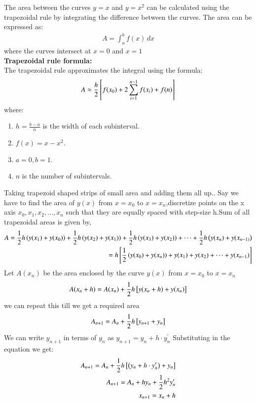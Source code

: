 \documentclass[journal]{IEEEtran}
\begin{document}
The area between the curves 
$y=x$ and $y=x^2$ can be calculated using the trapezoidal rule by integrating the difference between the curves. The area can be expressed as:
\begin{align}
    A = \int_{a}^{b} f(x) \, dx
\end{align}
where the curves intersect at $x=0$ and $x=1$\\
\textbf{Trapezoidal rule formula:}\\
The trapezoidal rule approximates the integral using the formula:\\
\begin{align}
    A \approx \frac{h}{2}{}\left[f(x_0)+2\sum_{i=1}^{n-1} f(x_i) + f(n)\right]
\end{align}
where:\\
\begin{enumerate}
   \item $h=\frac{b-a}{n}$ is the width of each subinterval.
   \item $f(x) = x-x^2$.
   \item $a=0,b=1$.
   \item $n$ is the number of subintervals.
\end{enumerate}
Taking trapezoid shaped strips of small area and adding them all up.. Say we have to
find the area of $y(x)$ from $x=x_0$ to $x = x_n$,discretize points on the x axis $x_0,x_1,x_2,...,x_n$ such that they are equally spaced with step-size h.Sum of all trapezoidal areas is given by,
\begin{align}
    A = \frac{1}{2}h\left(y(x_1)+y(x_0)\right)+\frac{1}{2}h\left(y(x_2)+y(x_1)\right)+\frac{1}{2}h\left(y(x_3)+y(x_2)\right)+\dots+\frac{1}{2}h\left(y(x_n)+y(x_{n-1)}\right)\\
    = h{}\left[\frac{1}{2}\left(y(x_0)+y(x_n)\right)+y(x_1)+y(x_2)+\dots+y(x_{n-1})\right]
\end{align}
Let $A(x_n)$ be the area enclosed by the curve $y(x)$ from $x=x_0$ to $x=x_n$
\begin{align}
    A(x_{n}+h) = A(x_n) + \frac{1}{2}h{}\left[y(x_{n}+h)+y(x_n)\right]
\end{align}
we can repeat this till we get a required area
\begin{align}
    A_{n+1} = A_n + \frac{1}{2}h{}\left[y_{n+1}+y_n\right]
\end{align}
We can write $y_{n+1}$ in terms of $y_n$ as $y_{n+1} = y_n + h\cdot y^{\prime}_n$
Substituting in the equation we get:
\begin{align}
    A_{n+1} = A_n +\frac{1}{2}h{}\left[\left(y_n+h\cdot y^{\prime}_n\right)+y_n\right]\\
    A_{n+1} = A_n + hy_n + \frac{1}{2}h^2y^{\prime}_n\\
    x_{n+1} = x_n + h
\end{align}
\end{document}
